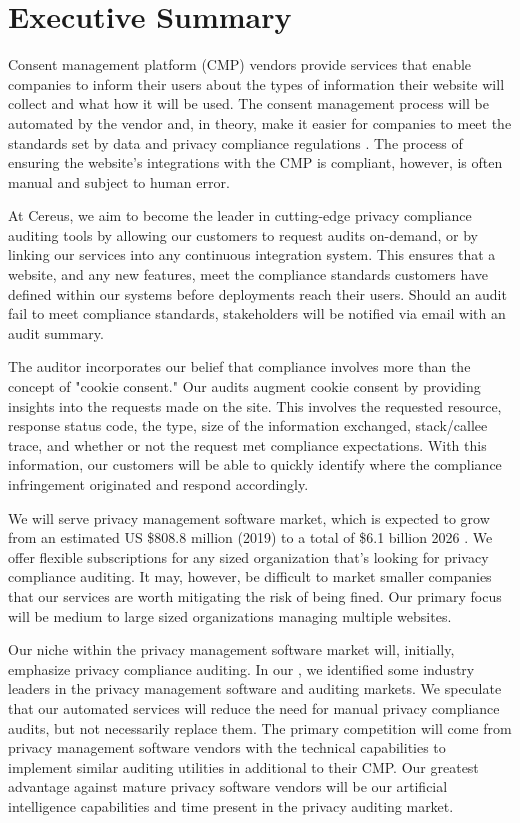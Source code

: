 {\let\cleardoublepage\relax \chapter*{Executive Summary}}

Consent management platform (CMP) vendors provide services that enable companies to inform their users about the types of information their website will collect and what how it will be used. The consent management process will be automated by the vendor and, in theory, make it easier for companies to meet the standards set by data and privacy compliance regulations \cite{cmp.what.2020}. The process of ensuring the website's integrations with the CMP is compliant, however, is often manual and subject to human error.

At Cereus, we aim to become the leader in cutting-edge privacy compliance auditing tools by allowing our customers to request audits on-demand, or by linking our services into any continuous integration system. This ensures that a website, and any new features, meet the compliance standards customers have defined within our systems before deployments reach their users. Should an audit fail to meet compliance standards, stakeholders will be notified via email with an audit summary.

The auditor incorporates our belief that compliance involves more than the concept of "cookie consent." Our audits augment cookie consent by providing insights into the requests made on the site. This involves the requested resource, response status code, the type, size of the information exchanged, stack/callee trace, and whether or not the request met compliance expectations. With this information, our customers will be able to quickly identify where the compliance infringement originated and respond accordingly.

We will serve privacy management software market, which is expected to grow from an estimated US \$808.8 million (2019) to a total of \$6.1 billion 2026 \cite{qy.2020}. We offer flexible subscriptions for any sized organization that's looking for privacy compliance auditing. It may, however, be difficult to market smaller companies that our services are worth mitigating the risk of being fined. Our primary focus will be medium to large sized organizations managing multiple websites. 

Our niche within the privacy management software market will, initially, emphasize privacy compliance auditing. In our , we identified some industry leaders in the privacy management software and auditing markets. We speculate that our automated services will reduce the need for manual privacy compliance audits, but not necessarily replace them. The primary competition will come from privacy management software vendors with the technical capabilities to implement similar auditing utilities in additional to their CMP. Our greatest advantage against mature privacy software vendors will be our artificial intelligence capabilities and time present in the privacy auditing market.

